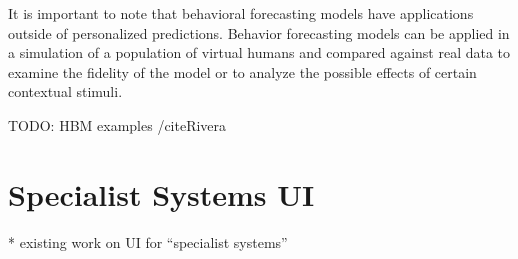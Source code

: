 It is important to note that behavioral forecasting models have applications outside of personalized predictions. 
Behavior forecasting models can be applied in a simulation of a population of virtual humans and compared against real data to examine the fidelity of the model or to analyze the possible effects of certain contextual stimuli. 

TODO: HBM examples /cite{Rivera}



\section{Specialist Systems UI}
* existing work on UI for “specialist systems”
